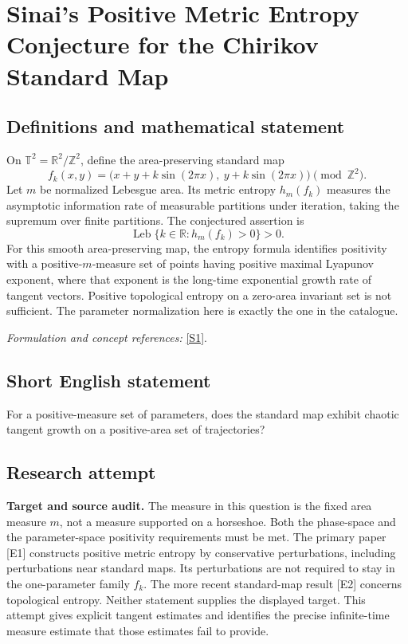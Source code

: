 \documentclass[11pt]{article}
\begin{document}
\section*{\texorpdfstring{Sinai's Positive Metric Entropy Conjecture for the Chirikov Standard Map}{Sinai's Positive Metric Entropy Conjecture for the Chirikov Standard Map}}\label{332}
\subsection{Definitions and mathematical statement}
On $\mathbb T^2={\mathbb{R}}^2/{\mathbb{Z}}^2$, define the area-preserving standard map
\[
 f_k(x,y)=\bigl(x+y+k\sin(2\pi x),\ y+k\sin(2\pi x)\bigr)\pmod{{\mathbb{Z}}^2}.
\]
Let $m$ be normalized Lebesgue area. Its metric entropy $h_m(f_k)$ measures the asymptotic information rate of measurable partitions under iteration, taking the supremum over finite partitions. The conjectured assertion is
\[
 \operatorname{Leb}\{k\in{\mathbb{R}}:h_m(f_k)>0\}>0.
\]
For this smooth area-preserving map, the entropy formula identifies positivity with a positive-$m$-measure set of points having positive maximal Lyapunov exponent, where that exponent is the long-time exponential growth rate of tangent vectors. Positive topological entropy on a zero-area invariant set is not sufficient. The parameter normalization here is exactly the one in the catalogue.
\par\smallskip\textit{Formulation and concept references:} \href{https://www.math.uci.edu/~asgor/Psim076.pdf}{[S1]}.

\subsection{Short English statement}
For a positive-measure set of parameters, does the standard map exhibit chaotic tangent growth on a positive-area set of trajectories?
\subsection{Research attempt}
\textbf{Target and source audit.}
The measure in this question is the fixed area measure $m$, not a measure
supported on a horseshoe.  Both the phase-space and the parameter-space
positivity requirements must be met.  The primary paper [E1] constructs
positive metric entropy by conservative perturbations, including perturbations
near standard maps.  Its perturbations are not required to stay in the
one-parameter family $f_k$.  The more recent standard-map result [E2] concerns
topological entropy.  Neither statement supplies the displayed target.  This
attempt gives explicit tangent estimates and identifies the precise infinite-time
measure estimate that those estimates fail to provide.
\end{document}
